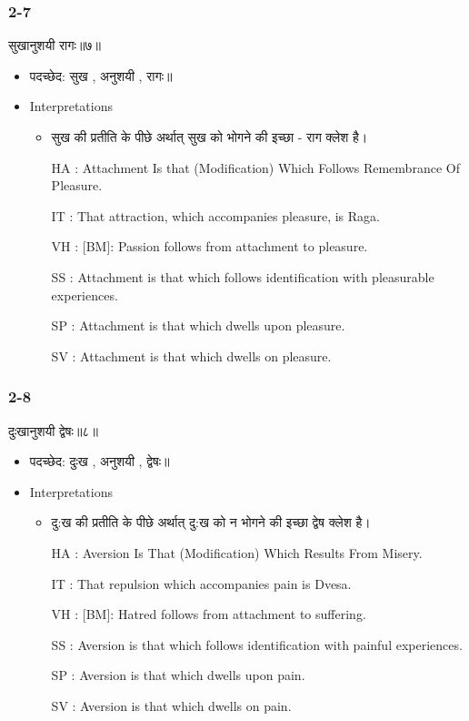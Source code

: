 \begin{frame}[fragile]\frametitle{2-7}
\begin{sanskrit}
सुखानुशयी रागः॥७॥
\end{sanskrit}

	\begin{itemize}
	\item पदच्छेद: सुख , अनुशयी , रागः॥
	\item Interpretations
		\begin{itemize}
		\item सुख की प्रतीति के पीछे अर्थात् सुख को भोगने की इच्छा - राग क्लेश है।
		\item [HA]: Attachment Is that (Modification) Which Follows Remembrance Of Pleasure.
		\item [IT]: That attraction, which accompanies pleasure, is Raga.
		\item [VH]: [BM]: Passion follows from attachment to pleasure.
		\item [SS]: Attachment is that which follows identification with pleasurable experiences.
		\item [SP]: Attachment is that which dwells upon pleasure.
		\item [SV]: Attachment is that which dwells on pleasure. 
		\end{itemize}
	\end{itemize}
	
\end{frame}



\begin{frame}[fragile]\frametitle{2-8}
\begin{sanskrit}
दुःखानुशयी द्वेषः॥८॥
\end{sanskrit}

	\begin{itemize}
	\item पदच्छेद: दुःख , अनुशयी , द्वेषः॥
	\item Interpretations
		\begin{itemize}
		\item दु:ख की प्रतीति के पीछे अर्थात् दु:ख को न भोगने की इच्छा द्वेष क्लेश है।
		\item [HA]: Aversion Is That (Modification) Which Results From Misery.
		\item [IT]: That repulsion which accompanies pain is Dvesa.
		\item [VH]: [BM]: Hatred follows from attachment to suffering.
		\item [SS]: Aversion is that which follows identification with painful experiences.
		\item [SP]: Aversion is that which dwells upon pain.
		\item [SV]: Aversion is that which dwells on pain. 
		\end{itemize}
	\end{itemize}
\end{frame}



